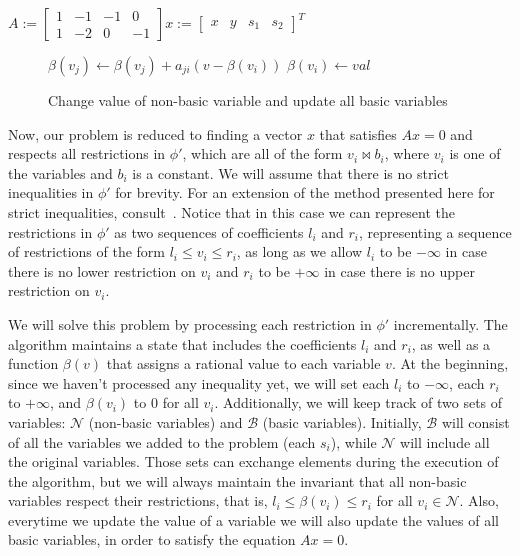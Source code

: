 \begin{center}
$
A :=
\begin{bmatrix}
  1 & -1 & -1 & 0 \\
  1 & -2 & 0 & -1
\end{bmatrix}
x :=
\begin{bmatrix}
  x & y & s_{1} & s_{2}
\end{bmatrix}^{T}
$
\end{center}

\begin{figure}[t]
\begin{algorithmic}[1]
    \State $\beta(v_{j}) \gets \beta(v_{j}) + a_{ji}(v - \beta(v_{i}))$
  \EndFor
    \State $\beta(v_{i}) \gets val$
  \EndProcedure
\end{algorithmic}
\caption{Change value of non-basic variable and update all basic variables}
\end{figure}

Now, our problem is reduced to finding a vector $x$ that satisfies $Ax = 0$ and respects all restrictions in $\phi'$, which are all of the form $v_{i} \bowtie b_{i}$, where $v_{i}$ is one of the variables and $b_{i}$ is a constant. We will assume that there is no strict inequalities in $\phi'$ for brevity. For an extension of the method presented here for strict inequalities, consult~\cite{simplex_dpllt}. Notice that in this case we can represent the restrictions in $\phi'$ as two sequences of coefficients $l_{i}$ and $r_{i}$, representing a sequence of restrictions of the form $l_{i} \le v_{i} \le r_{i}$, as long as we allow $l_{i}$ to be $-\infty$ in case there is no lower restriction on $v_{i}$ and $r_{i}$ to be $+\infty$ in case there is no upper restriction on $v_{i}$.

We will solve this problem by processing each restriction in $\phi'$ incrementally. The algorithm maintains a state that includes the coefficients $l_{i}$ and $r_{i}$, as well as a function $\beta(v)$ that assigns a rational value to each variable $v$. At the beginning, since we haven't processed any inequality yet, we will set each $l_{i}$ to $-\infty$, each $r_{i}$ to $+\infty$, and $\beta(v_{i})$ to $0$ for all $v_{i}$. Additionally, we will keep track of two sets of variables: $\mathcal{N}$ (non-basic variables) and $\mathcal{B}$ (basic variables). Initially, $\mathcal{B}$ will consist of all the variables we added to the problem (each $s_{i}$), while $\mathcal{N}$ will include all the original variables.
Those sets can exchange elements during the execution of the algorithm, but we will always maintain the invariant that all non-basic variables respect their restrictions, that is, $l_{i} \le \beta(v_{i}) \le r_{i}$ for all $v_{i} \in \mathcal{N}$. Also, everytime we update the value of a variable we will also update the values of all basic variables, in order to satisfy the equation $Ax = 0$.


